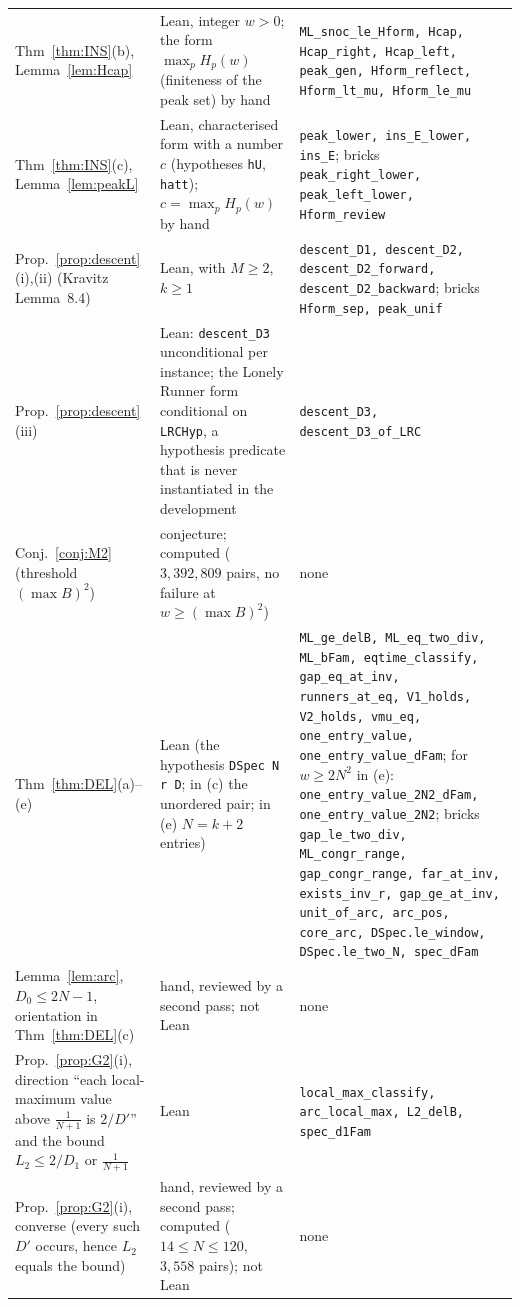 \documentclass[11pt]{article}
\theoremstyle{definition}
\theoremstyle{remark}
\begin{document}
{\begin{longtable}{@{}p{}p{}p{}@{}}
Thm~\ref{thm:INS}(b), Lemma~\ref{lem:Hcap} & Lean, integer $w>0$; the form $\max_pH_p(w)$ (finiteness of the peak set) by hand & \texttt{ML\_snoc\_le\_Hform, Hcap, Hcap\_right, Hcap\_left, peak\_gen, Hform\_reflect, Hform\_lt\_mu, Hform\_le\_mu} \\
Thm~\ref{thm:INS}(c), Lemma~\ref{lem:peakL} & Lean, characterised form with a number $c$ (hypotheses \texttt{hU}, \texttt{hatt}); $c=\max_pH_p(w)$ by hand & \texttt{peak\_lower, ins\_E\_lower, ins\_E}; bricks \texttt{peak\_right\_lower, peak\_left\_lower, Hform\_review} \\
Prop.~\ref{prop:descent}(i),(ii) (Kravitz Lemma~8.4) & Lean, with $M\ge2$, $k\ge1$ & \texttt{descent\_D1, descent\_D2, descent\_D2\_forward, descent\_D2\_backward}; bricks \texttt{Hform\_sep, peak\_unif} \\
Prop.~\ref{prop:descent}(iii) & Lean: \texttt{descent\_D3} unconditional per instance; the Lonely Runner form conditional on \texttt{LRCHyp}, a hypothesis predicate that is never instantiated in the development & \texttt{descent\_D3, descent\_D3\_of\_LRC} \\
Conj.~\ref{conj:M2} (threshold $(\max B)^2$) & conjecture; computed ($3{,}392{,}809$ pairs, no failure at $w\ge(\max B)^2$) & none \\
Thm~\ref{thm:DEL}(a)--(e) & Lean (the hypothesis \texttt{DSpec N r D}; in (c) the unordered pair; in (e) $N=k+2$ entries) & \texttt{ML\_ge\_delB, ML\_eq\_two\_div, ML\_bFam, eqtime\_classify, gap\_eq\_at\_inv, runners\_at\_eq, V1\_holds, V2\_holds, vmu\_eq, one\_entry\_value, one\_entry\_value\_dFam}; for $w\ge2N^2$ in (e): \texttt{one\_entry\_value\_2N2\_dFam, one\_entry\_value\_2N2}; bricks \texttt{gap\_le\_two\_div, ML\_congr\_range, gap\_congr\_range, far\_at\_inv, exists\_inv\_r, gap\_ge\_at\_inv, unit\_of\_arc, arc\_pos, core\_arc, DSpec.le\_window, DSpec.le\_two\_N, spec\_dFam} \\
Lemma~\ref{lem:arc}, $D_0\le2N-1$, orientation in Thm~\ref{thm:DEL}(c) & hand, reviewed by a second pass; not Lean & none \\
Prop.~\ref{prop:G2}(i), direction ``each local-maximum value above $\frac1{N+1}$ is $2/D'$'' and the bound $L_2\le2/D_1$ or $\frac1{N+1}$ & Lean & \texttt{local\_max\_classify, arc\_local\_max, L2\_delB, spec\_d1Fam} \\
Prop.~\ref{prop:G2}(i), converse (every such $D'$ occurs, hence $L_2$ equals the bound) & hand, reviewed by a second pass; computed ($14\le N\le120$, $3{,}558$ pairs); not Lean & none \\

\end{longtable}}
\end{document}
